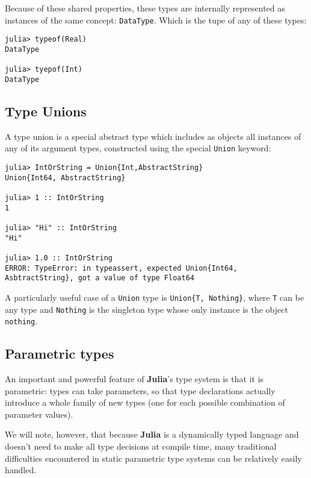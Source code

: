 \documentclass[
]{article}
\begin{document}
Because of these shared properties, these types are internally
represented as instances of the same concept: \texttt{DataType}. Which
is the tupe of any of these types:

\begin{verbatim}
julia> typeof(Real)
DataType

julia> tyepof(Int)
DataType
\end{verbatim}

\hypertarget{type-unions}{%
\subsection{Type Unions}\label{type-unions}}

A type union is a special abstract type which includes as objects all
instances of any of its argument types, constructed using the special
\texttt{Union} keyword:

\begin{verbatim}
julia> IntOrString = Union{Int,AbstractString}
Union{Int64, AbstractString}

julia> 1 :: IntOrString
1

julia> "Hi" :: IntOrString
"Hi"

julia> 1.0 :: IntOrString
ERROR: TypeError: in typeassert, expected Union{Int64, AsbtractString}, got a value of type Float64
\end{verbatim}

A particularly useful case of a \texttt{Union} type is
\texttt{Union\{T,\ Nothing\}}, where \texttt{T} can be any type and
\texttt{Nothing} is the singleton type whose only instance is the object
\texttt{nothing}.

\hypertarget{parametric-types}{%
\subsection{Parametric types}\label{parametric-types}}

An important and powerful feature of \textbf{Julia}'s type system is
that it is parametric: types can take parameters, so that type
declarations actually introduce a whole family of new types (one for
each possible combination of parameter values).

We will note, however, that because \textbf{Julia} is a dynamically
typed language and doesn't need to make all type decisions at compile
time, many traditional difficulties encountered in static parametric
type systems can be relatively easily handled.
\end{document}
